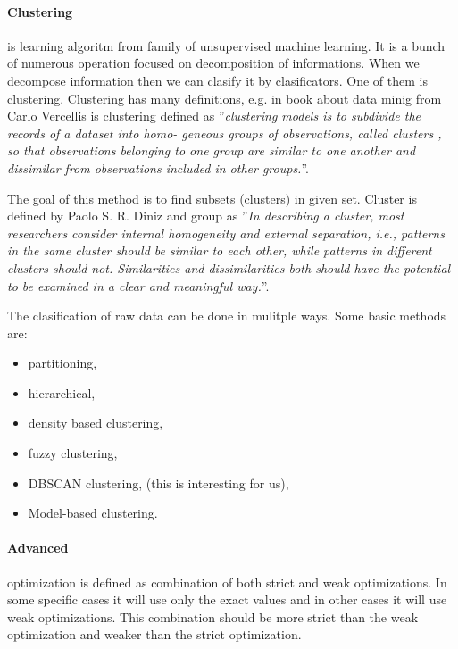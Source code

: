 	\paragraph{Clustering} is learning algoritm from family of unsupervised machine learning. It is
	a bunch of numerous operation focused on decomposition of informations.
	When we decompose information then we can clasify it by clasificators.
	One of them is clustering. Clustering has many definitions, e.g.
	 in book about data minig from Carlo Vercellis is clustering defined as
	''\emph{clustering models is to subdivide the records of a dataset into homo-
	geneous groups of observations, called clusters , so that observations belonging
	to one group are similar to one another and dissimilar from observations
	included in other groups.}''. \cite{doi:10.1002/9780470753866.ch12}

	The goal of this method is to find subsets (clusters) in given set.
	Cluster is defined by Paolo S. R. Diniz and group as ''\emph{In describing a cluster,
	most researchers consider internal homogeneity and external separation,
	i.e., patterns in the same cluster should be similar to each other, while patterns in different
	clusters should not. Similarities and dissimilarities both should have the potential to be examined in a
	clear and meaningful way.}''. \cite{Lam20141115}

	The clasification of raw data can be done in mulitple ways.
	Some basic methods are:
	\begin{itemize}
		\item partitioning,
		\item hierarchical,
		\item density based clustering,
		\item fuzzy clustering,
		\item DBSCAN clustering, (this is interesting for us),
		\item Model-based clustering.
	\end{itemize}

	\paragraph{Advanced}
	optimization is defined as combination of both strict and weak optimizations.
	In some specific cases it will use only the exact values and in other cases it will use weak optimizations.
	This combination should be more strict than the weak optimization and weaker than the strict optimization.

